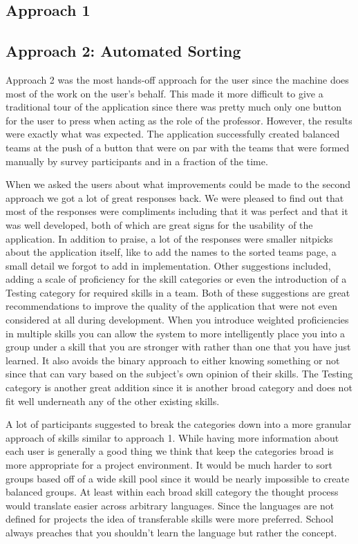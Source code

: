 \documentclass[conference]{IEEEtran}
\begin{document}
\subsection{Approach 1}

\subsection{Approach 2: Automated Sorting}
Approach 2 was the most hands-off approach for the user since the machine does most of the work on the user's behalf. This made it more difficult to give a traditional tour of the application since there was pretty much only one button for the user to press when acting as the role of the professor. However, the results were exactly what was expected. The application successfully created balanced teams at the push of a button that were on par with the teams that were formed manually by survey participants and in a fraction of the time. 

When we asked the users about what improvements could be made to the second approach we got a lot of great responses back. We were pleased to find out that most of the responses were compliments including that it was perfect and that it was well developed, both of which are great signs for the usability of the application. In addition to praise, a lot of the responses were smaller nitpicks about the application itself, like to add the names to the sorted teams page, a small detail we forgot to add in implementation. Other suggestions included, adding a scale of proficiency for the skill categories or even the introduction of a Testing category for required skills in a team. Both of these suggestions are great recommendations to improve the quality of the application that were not even considered at all during development. When you introduce weighted proficiencies in multiple skills you can allow the system to more intelligently place you into a group under a skill that you are stronger with rather than one that you have just learned. It also avoids the binary approach to either knowing something or not since that can vary based on the subject's own opinion of their skills. The Testing category is another great addition since it is another broad category and does not fit well underneath any of the other existing skills. 

A lot of participants suggested to break the categories down into a more granular approach of skills similar to approach 1. While having more information about each user is generally a good thing we think that keep the categories broad is more appropriate for a project environment. It would be much harder to sort groups based off of a wide skill pool since it would be nearly impossible to create balanced groups. At least within each broad skill category the thought process would translate easier across arbitrary languages. Since the languages are not defined for projects the idea of transferable skills were more preferred. School always preaches that you shouldn't learn the language but rather the concept. 
\end{document}
